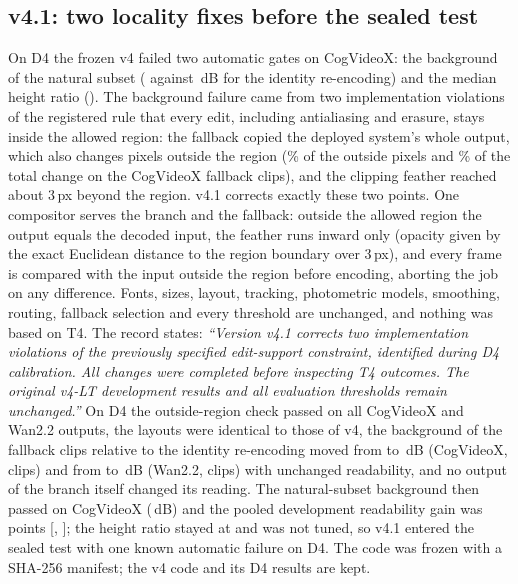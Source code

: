 \subsection{v4.1: two locality fixes before the sealed test}
\label{sec:supp_g_v41}
On D4 the frozen v4 failed two automatic gates on CogVideoX: the background of the natural subset (\gDCogNatBgVfour{} against \gDCogNatBgNoop\,dB for the identity re-encoding) and the median height ratio (\gDCogHeight). The background failure came from two implementation violations of the registered rule that every edit, including antialiasing and erasure, stays inside the allowed region: the fallback copied the deployed system's whole output, which also changes pixels outside the region (\gCCogLeakFrac\% of the outside pixels and \gCCogLeakShare\% of the total change on the CogVideoX fallback clips), and the clipping feather reached about 3\,px beyond the region. v4.1 corrects exactly these two points. One compositor serves the branch and the fallback: outside the allowed region the output equals the decoded input, the feather runs inward only (opacity given by the exact Euclidean distance to the region boundary over 3\,px), and every frame is compared with the input outside the region before encoding, aborting the job on any difference. Fonts, sizes, layout, tracking, photometric models, smoothing, routing, fallback selection and every threshold are unchanged, and nothing was based on T4. The record states: \emph{``Version v4.1 corrects two implementation violations of the previously specified edit-support constraint, identified during D4 calibration. All changes were completed before inspecting T4 outcomes. The original v4-LT development results and all evaluation thresholds remain unchanged.''} On D4 the outside-region check passed on all \gCCogChecked{} CogVideoX and \gCWanChecked{} Wan2.2 outputs, the layouts were identical to those of v4, the background of the fallback clips relative to the identity re-encoding moved from \gCCogFbBgBefore{} to \gCCogFbBgAfter\,dB (CogVideoX, \gCCogFbN{} clips) and from \gCWanFbBgBefore{} to \gCWanFbBgAfter\,dB (Wan2.2, \gCWanFbN{} clips) with unchanged readability, and no output of the branch itself changed its reading. The natural-subset background then passed on CogVideoX (\gDCogNatBgVfourone\,dB) and the pooled development readability gain was \gDReadGain{} points [\gDReadGainLo, \gDReadGainHi]; the height ratio stayed at \gDCogHeight{} and was not tuned, so v4.1 entered the sealed test with one known automatic failure on D4. The code was frozen with a SHA-256 manifest; the v4 code and its D4 results are kept.

